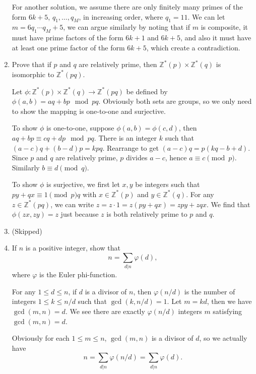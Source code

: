 \documentclass{article}
\begin{document}
\begin{enumerate}
\begin{solution}
        For another solution, we assume there are only finitely many primes of the form $6k+5$, $q_1, \dots, q_M$, in increasing order,
        where $q_1=11$.
        We can let $m=6q_1\cdots q_M+5$, we can argue similarly by noting that if $m$ is composite, it must have prime factors of the form
        $6k+1$ and $6k+5$, and also it must have at least one prime factor of the form $6k+5$, which create a contradiction.
    \end{solution}

    \item Prove that if $p$ and $q$ are relatively prime, then $\mathbb Z^* (p) \times \mathbb Z^* (q)$ is isomorphic to $\mathbb Z^* (pq)$.
    
    \begin{solution}
        Let $\phi: \mathbb Z^* (p) \times \mathbb Z^* (q) \to \mathbb Z^* (pq)$ be defined by $\phi(a,b) = aq+bp \mod pq$.
        Obviously both sets are groups, so we only need to show the mapping is one-to-one and surjective.

        To show $\phi$ is one-to-one, suppose $\phi(a,b) = \phi(c,d)$, then $aq+bp \equiv cq+dp \mod pq$. There is an integer $k$ such that
        $(a-c)q+(b-d)p = kpq.$ Rearrange to get $(a-c)q = p(kq-b+d)$. Since $p$ and $q$ are relatively prime, $p$ divides $a-c$, hence $a\equiv c\pmod p$.
        Similarly $b\equiv d\pmod q$.

        To show $\phi$ is surjective, we first let $x,y$ be integers such that $py+qx\equiv 1\pmod pq$ with $x\in\mathbb Z^*(p)$ and $y\in\mathbb Z^*(q)$.
        For any $z\in\mathbb Z^*(pq)$, we can write $z = z\cdot 1 = z(py+qx) = zpy+zqx$. We find that $\phi(zx, zy) = z$ just because $z$ is
        both relatively prime to $p$ and $q$. 
    \end{solution}

    \item (Skipped)
    \item If $n$ is a positive integer, show that
    $$n=\sum_{d|n}\varphi(d),$$
    where $\varphi$ is the Euler phi-function.

    \begin{solution}
        For any $1\leq d\leq n$, if $d$ is a divisor of $n$, then $\varphi(n/d)$ is the number of integers $1\leq k\leq n/d$ such that
        $\gcd(k, n/d)=1$. Let $m=kd$, then we have $\gcd(m, n)=d$. We see there are exactly $\varphi(n/d)$ integers $m$ satisfying
        $\gcd(m,n)=d$.

        Obviously for each $1\leq m\leq n$, $\gcd(m,n)$ is a divisor of $d$, so we actually have
        $$n=\sum_{d|n} \varphi(n/d) = \sum_{d|n}\varphi(d).$$
    \end{solution}


\end{enumerate}
\end{document}
